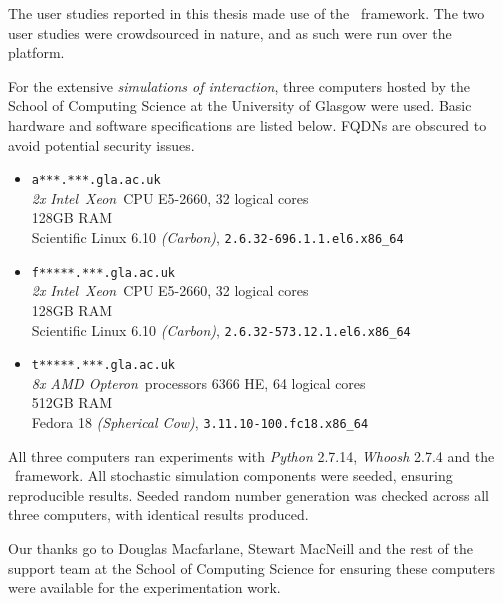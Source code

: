 
\begin{preamble}
{}

The user studies reported in this thesis made use of the \treconomics~framework. The two user studies were crowdsourced in nature, and as such were run over the~ platform.

For the extensive \emph{simulations of interaction}, three computers hosted by the School of Computing Science at the University of Glasgow were used. Basic hardware and software specifications are listed below. FQDNs are obscured to avoid potential security issues.

\begin{itemize}
    
    \item{\texttt{a***.***.gla.ac.uk}\\\emph{2x} \emph{Intel}\textregistered~\emph{Xeon}\textregistered~CPU E5-2660, 32 logical cores\\128GB RAM\\Scientific Linux 6.10 \emph{(Carbon)}, \texttt{2.6.32-696.1.1.el6.x86\_64}}
    
    \item{\texttt{f*****.***.gla.ac.uk}\\\emph{2x} \emph{Intel}\textregistered~\emph{Xeon}\textregistered~CPU E5-2660, 32 logical cores\\128GB RAM\\Scientific Linux 6.10 \emph{(Carbon)}, \texttt{2.6.32-573.12.1.el6.x86\_64}}
    
    \item{\texttt{t*****.***.gla.ac.uk}\\\emph{8x} \emph{AMD Opteron}\texttrademark~processors 6366 HE, 64 logical cores\\512GB RAM\\Fedora 18 \emph{(Spherical Cow)}, \texttt{3.11.10-100.fc18.x86\_64}}
    
\end{itemize}

All three computers ran experiments with \emph{Python} 2.7.14, \emph{Whoosh} 2.7.4 and the \simiir~framework. All stochastic simulation components were seeded, ensuring reproducible results. Seeded random number generation was checked across all three computers, with identical results produced.

Our thanks go to Douglas Macfarlane, Stewart MacNeill and the rest of the support team at the School of Computing Science for ensuring these computers were available for the experimentation work.
\end{preamble}